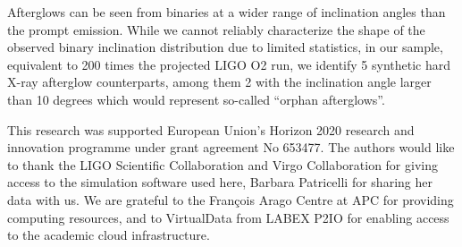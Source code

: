 \documentclass[11pt]{article}
\begin{document}
Afterglows can be seen from binaries at a wider range of inclination
angles than the prompt emission. While we cannot reliably characterize
the shape of the observed binary inclination distribution due to
limited statistics, in our sample, equivalent to 200 times the
projected LIGO O2 run, we identify 5 synthetic hard X-ray afterglow
counterparts, among them 2 with the inclination angle larger than 10
degrees which would represent so-called ``orphan afterglows''.

\vspace{3mm}


{\linespread{0.1} \footnotesize \noindent This research was supported
  European Union's Horizon 2020 research and innovation programme
  under grant agreement No 653477. The authors would like to thank the
  LIGO Scientific Collaboration and Virgo Collaboration for giving
  access to the simulation software used here, Barbara Patricelli for
  sharing her data with us. We are grateful to the François Arago
  Centre at APC for providing computing resources, and to VirtualData
  from LABEX P2IO for enabling access to the academic cloud infrastructure.}


\vspace*{-5mm}
{\footnotesize
}
\end{document}
